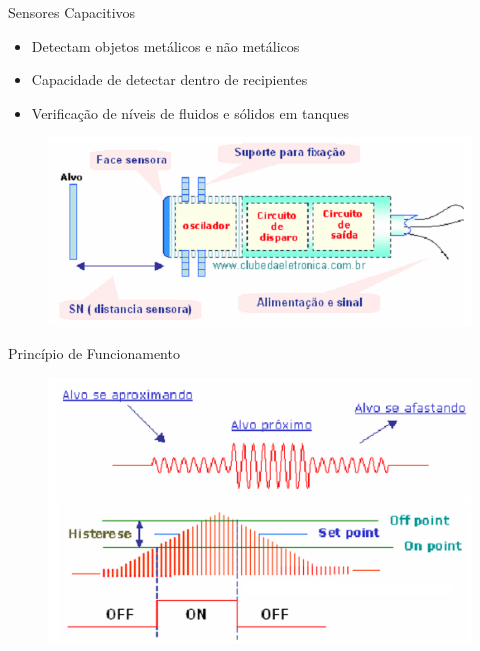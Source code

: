 \documentclass[aspectratio=169,
				xcolor=table]{beamer}
\begin{document}
		\begin{frame}{Sensores Capacitivos}
			\begin{itemize}
				\item Detectam objetos metálicos e não metálicos
				\vspace{0.8cm}
				\item Capacidade de detectar dentro de recipientes
				\vspace{0.8cm}
				\item Verificação de níveis de fluidos e sólidos em tanques
	
			\end{itemize}
	
			\begin{figure}
				\centering	
				\includegraphics[scale=.5]{../figs/cap03/Imagem22}
			\end{figure}							
	
		\end{frame}
		
		\begin{frame}{Princípio de Funcionamento}
			\begin{figure}
				\centering	
				\includegraphics[scale=.35]{../figs/cap03/Imagem23}
			\end{figure}
		\end{frame}
	
\end{document}
